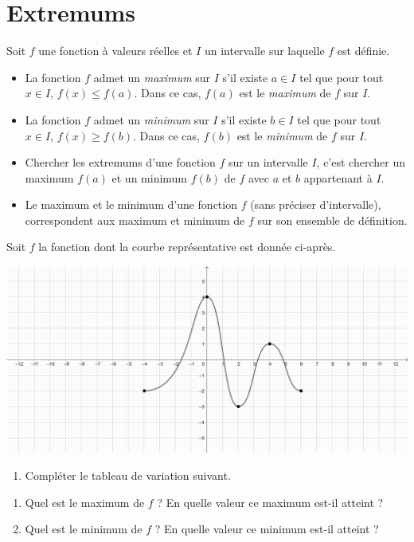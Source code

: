 \documentclass[poly]{mesCours}
\begin{document}
\section{Extremums}
\begin{definition}
Soit $f$ une fonction à valeurs réelles et $I$ un intervalle sur laquelle $f$ est définie. 
\begin{itemize}
\item La fonction $f$ admet un \emph{maximum} sur $I$ s'il existe $a \in I$ tel que pour tout $x \in I$, $f(x) \leq f(a)$. Dans ce cas, $f(a)$ est le \emph{maximum} de $f$ sur $I$.
\item La fonction $f$ admet un \emph{minimum} sur $I$ s'il existe $b \in I$ tel que pour tout $x \in I$, $f(x) \geq f(b)$. Dans ce cas, $f(b)$ est le \emph{minimum} de $f$ sur $I$.
\end{itemize}
\end{definition}
\begin{remark}
\begin{itemize}
\item Chercher les extremums d'une fonction $f$ sur un intervalle $I$, c'est chercher un maximum $f(a)$ et un minimum $f(b)$ de $f$ avec $a$ et $b$ appartenant à $I$.
\item Le maximum et le minimum d'une fonction $f$ (sans préciser d'intervalle), correspondent aux maximum et minimum de $f$ sur son ensemble de définition.
\end{itemize}
\end{remark}
\begin{example}
Soit $f$ la fonction dont la courbe représentative est donnée ci-après.
\begin{center}
\includegraphics[scale=0.7]{Polynome2MaxMin.png}
\end{center}
\begin{enumerate}
\item Compléter le tableau de variation suivant.
\end{enumerate}
\begin{center}
\end{center}
\begin{enumerate}[resume*]
\item Quel est le maximum de $f$ ? En quelle valeur ce maximum est-il atteint ? 
\item Quel est le minimum de $f$ ? En quelle valeur ce minimum est-il atteint ? 
\end{enumerate}
\end{example}
\end{document}

